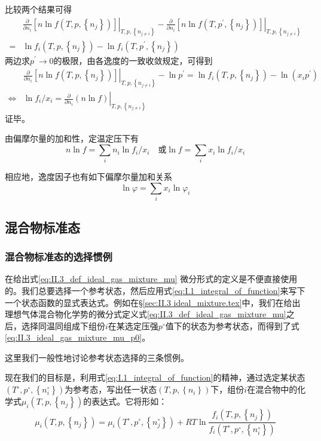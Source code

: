 \documentclass[main.tex]{subfiles}
\begin{document}
比较两个结果可得
\begin{align*}
      & \left.\frac{\partial}{\partial n_i}\left[n\ln f\left(T,p,\left\{n_j\right\}\right)\right]\right|_{T,p,\left\{n_{j\neq i}\right\}}-\left.\frac{\partial}{\partial n_i}\left[n\ln f\left(T,p^\prime,\left\{n_j\right\}\right)\right]\right|_{T,p,\left\{n_{j\neq i}\right\}} \\
    = & \ln f_i\left(T,p,\left\{n_j\right\}\right)-\ln f_i\left(T,p^\prime,\left\{n_j\right\}\right)
\end{align*}
两边求$p^\prime\rightarrow 0$的极限，由各逸度的一致收敛规定，可得到
\begin{align*}
                    & \left.\frac{\partial}{\partial n_i}\left[n\ln f\left(T,p,\left\{n_j\right\}\right)\right]\right|_{T,p,\left\{n_{j\neq i}\right\}}-\ln p^\prime=\ln f_i\left(T,p,\left\{n_j\right\}\right)-\ln\left(x_ip^\prime\right) \\
    \Leftrightarrow & \ln f_i/x_i=\left.\frac{\partial}{\partial n_i}\left(n\ln f\right)\right|_{T,p,\left\{n_{j\neq i}\right\}}
\end{align*}
证毕。

由偏摩尔量的加和性，定温定压下有
\[n\ln f=\sum_i n_i\ln f_i/x_i\quad\text{或}\ln f=\sum_ix_i\ln f_i/x_i\]

相应地，逸度因子也有如下偏摩尔量加和关系
\[\ln \varphi=\sum_ix_i\ln\varphi_i\]

\subsection{混合物标准态}
\subsubsection{混合物标准态的选择惯例}
在给出式\eqref{eq:II.3_def_ideal_gas_mixture_mu}
微分形式的定义是不便直接使用的。我们总要选择一个参考状态，然后应用式\eqref{eq:I.1_integral_of_function}来写下一个状态函数的显式表达式。例如在\S\ref{sec:II.3 ideal_mixture.tex}中，我们在给出理想气体混合物化学势的微分式定义式\eqref{eq:II.3_def_ideal_gas_mixture_mu}之后，选择同温同组成下组份$i$在某选定压强$p^\circ$值下的状态为参考状态，而得到了式\eqref{eq:II.3_ideal_gas_mixture_mu_p0}。

这里我们一般性地讨论参考状态选择的三条惯例。

现在我们的目标是，利用式\eqref{eq:I.1_integral_of_function}的精神，通过选定某状态$\left(T^\circ,p^\circ,\left\{n_i^\circ\right\}\right)$为参考态，写出任一状态$\left(T,p,\left\{n_i\right\}\right)$下，组份$i$在混合物中的化学式$\mu_i\left(T,p,\left\{n_j\right\}\right)$的表达式。它将形如：
\begin{equation*}
    \mu_i\left(T,p,\left\{n_j\right\}\right)=\mu_i\left(T^\circ,p^\circ,\left\{n_j^\circ\right\}\right)+RT\ln\frac{f_i\left(T,p,\left\{n_j\right\}\right)}{f_i\left(T^\circ,p^\circ,\left\{n_i^\circ\right\}\right)}
\end{equation*}
\end{document}

